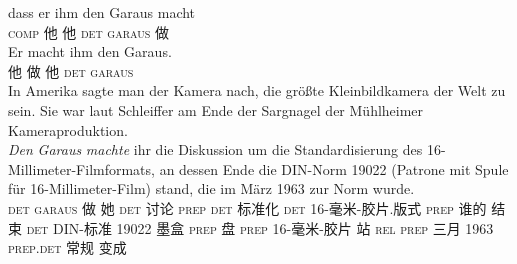 \eal
\ex 
\gll dass er ihm den Garaus macht\\
     \textsc{comp} 他 他 \textsc{det} \textsc{garaus} 做\\
\ex 
\gll Er macht ihm den Garaus.\\
	 他 做 他 \textsc{det} \textsc{garaus}\\
\ex
In Amerika sagte man der Kamera nach, die größte Kleinbildkamera der Welt zu sein. Sie war laut
Schleiffer am Ende der Sargnagel der Mühlheimer Kameraproduktion.\\
\gll 
\emph{Den} \emph{Garaus} \emph{machte} ihr die Diskussion um die Standardisierung des 16-Millimeter-Filmformats,
an dessen Ende die DIN-Norm 19022 (Patrone mit Spule für 16-Millimeter-Film) stand, die im März 1963
zur Norm wurde.\footnotemark\\
\textsc{det} \textsc{garaus} 做 她
\textsc{det} 讨论 \textsc{prep} \textsc{det} 标准化 \textsc{det} 16-毫米-胶片.版式 \textsc{prep} 谁的 结束 \textsc{det} DIN-标准 19022
\spacebr{}墨盒 \textsc{prep} 盘 \textsc{prep} 16-毫米-胶片 站 \textsc{rel} \textsc{prep} 三月 1963 \textsc{prep}.\textsc{det} 常规
变成\\
